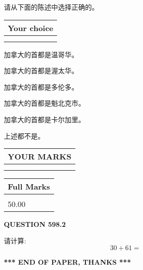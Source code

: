 \documentclass{ctexart}
\begin{document}
  
请从下面的陈述中选择正确的。
  
  
\noindent\hspace{3.0in} \begin{tabular}{|l|}
\hline
Your choice \\
\hline
 \\ 
 \\ 
\hline
\end{tabular}
  
  
 
 
加拿大的首都是温哥华。
 
 
加拿大的首都是渥太华。
 
 
加拿大的首都是多伦多。
 
 
加拿大的首都是魁北克市。
 
 
加拿大的首都是卡尔加里。
 
 
 上述都不是。
 
 
  
\vspace{0.2in}
  
\noindent\begin{tabular}{|l|}
\hline
 YOUR MARKS  \\
\hline
 \\ 
 \\ 
\hline
\end{tabular}
\hspace{0.05in} \begin{tabular}{|l|}
\hline
 Full Marks  \\
\hline
 \\ 
50.00 \\
\hline
\end{tabular}
{\textbf{\Large{QUESTION
598.2 
}}}
  
  
 
请计算:
\begin{equation}
30 +  %
61 = \nonumber
\end{equation}
 

 

 
   
   
 \vspace{0.2in}
 
   
   
   
   
\vspace{1.0in} 
{\textbf{\large{ *** END OF PAPER, THANKS *** }}} 
   
\end{document}
